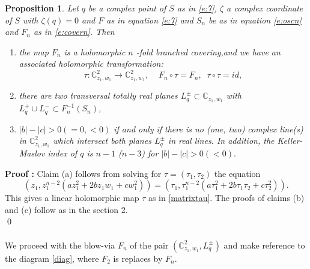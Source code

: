 \documentclass{amsart}
\newtheorem{proposition}[theorem]{Proposition}
\begin{document}
\begin{proposition} \label{p:11n}
Let $q$ be a complex point of $S$  as in \eqref{e:7}, $\zeta$ a complex coordinate of $S$ with $\zeta(q) = 0$ and $F$ as in equation \eqref{e:7} and  $S_n$ be as in equation \eqref{e:oscn} and $F_n$ as in \eqref{e:covern}.  Then
\begin{enumerate}
\item[(a)] the map $F_n$ is a holomorphic $n$ -fold branched covering,and we have an associated holomorphic transformation:
\[
\tau:{\mathbb{C}}^2_{z_1,w_1}\to {\mathbb{C}}^2_{z_1,w_1},
\;\;
\;\;F_n \circ \tau =F_n , \;\; \tau \circ \tau = id,
\]
\item[(b)] there are two transversal totally real planes $ L^\pm_ q \subset
{\mathbb{C}}_{z_1,w_1}$ with $ L^+_ q \cup L^-_ q \subset F^{-1}_n ( S_n)$,
\item[(c)]  $|b| - |c| > 0 ( = 0, < 0)$ if and only if there is no (one, two) complex line(s) in ${\mathbb{C}}^2_{z_1,w_1}$ which intersect both planes $L^\pm_ q$ in real lines. In addition, the Keller-Maslov index of $q$ is $n-1$ ($n-3$) for $|b| - |c| >  0 (< 0).$
\end{enumerate}
\end{proposition}
\noindent
{\bf Proof :}
Claim (a) follows from solving for $\tau = (\tau_1,\tau_2)$  the equation 
$$(z_1, z_1^{n-2}(a z_1^2 + 2b z_1 w_1 + c w_1^2) ) = (\tau_1, \tau_1^{n-2}(a\tau_1^2 + 2b \tau_1 \tau_2 + c \tau_2^2)).$$ This gives a linear holomorphic map $\tau$ as in \eqref{matrixtau}. The proofs of claims (b) and (c) follow as in the section 2.\\ 
\qed \\\\
We proceed with the blow-via $F_n$ of the pair $(\mathbb{C}^2_{z_1,w_1}, L^\pm_q )$ and make reference to the diagram \eqref{diag}, where $F_2$ is replaces by $F_n$.
\end{document}
